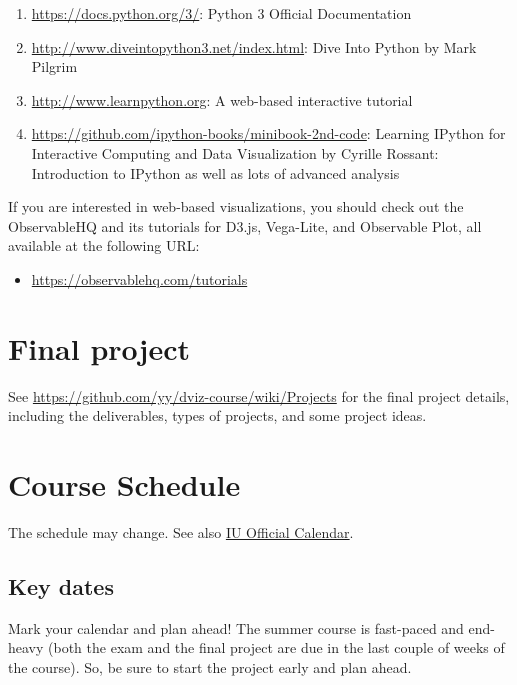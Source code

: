 \documentclass[11pt,article,oneside]{memoir} %
\begin{document}
\begin{enumerate}%

\item \url{https://docs.python.org/3/}: Python 3 Official Documentation

\item \url{http://www.diveintopython3.net/index.html}: Dive Into Python by Mark Pilgrim 

\item \url{http://www.learnpython.org}: A web-based interactive tutorial 

\item \url{https://github.com/ipython-books/minibook-2nd-code}: Learning IPython for Interactive Computing and Data Visualization by Cyrille Rossant: Introduction to IPython as well as lots of advanced analysis 

\end{enumerate}%

If you are interested in web-based visualizations, you should check out the ObservableHQ and its tutorials for D3.js, Vega-Lite, and Observable Plot, all available at the following URL:

\begin{itemize}
    \item \url{https://observablehq.com/tutorials}
\end{itemize}

\section{Final project}%

See \url{https://github.com/yy/dviz-course/wiki/Projects} for the final project details, including the deliverables, types of projects, and some project ideas. 

\section{Course Schedule}%

The schedule may change. See also \href{https://registrar.indiana.edu/official-calendar/index.shtml}{IU Official Calendar}. 

\subsection{Key dates}\label{sub:key_dates} %

Mark your calendar and plan ahead! 
The summer course is fast-paced and end-heavy (both the exam and the final project are due in the last couple of weeks of the course). So, be sure to start the project early and plan ahead. 
\end{document}
